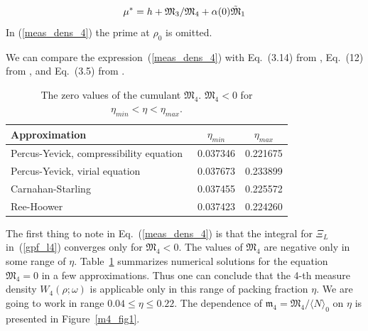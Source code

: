 \begin{equation}
	\label{mu_star}
	\mu^* = h + {\frak M_3}/{\frak M_4} + \alpha(0)\tilde{\frak M}_1
\end{equation}
In (\ref{meas_dens_4}) the prime at $\rho_0$ is omitted.

We can compare the expression~(\ref{meas_dens_4}) with Eq.~(3.14) from \cite{Yukh1990}, Eq.~(12) from \cite{YukhJSP1995}, and Eq.~(3.5) from \cite{Yukh2013}.

\begin{table}[h]
	\caption{The zero values of the cumulant $\mathfrak{M_4}$. $\mathfrak{M_4} < 0$ for $\eta_{min} < \eta < \eta_{max}$.}
	\label{tab:cum_m4_zeros}
	\begin{center}
		\begin{tabular}{|l|c|c|}
			\hline
			Approximation & $\eta_{min}$ & $\eta_{max}$ \\
			\hline
			Percus-Yevick, compressibility equation~\cite{WertheimPRL1963} \quad & 0.037346 \quad & 0.221675 \quad \\
			Percus-Yevick, virial equation~\cite{ThieleJCP1963}	& 0.037673 & 0.233899 \\
			Carnahan-Starling~\cite{CarnahanStarling1969}		& 0.037455 & 0.225572 \\
			Ree-Hoower~\cite{ReeHooverJCP1964}					& 0.037423 & 0.224260 \\
			\hline
		\end{tabular}
	\end{center}
\end{table}

The first thing to note in Eq.~(\ref{meas_dens_4}) is that the integral for $\Xi_L$ in~(\ref{gpf_l4}) converges only for $\mathfrak{M}_4 < 0$. The values of $\mathfrak M_4$ are negative only in some range of $\eta$. Table~{\ref{tab:cum_m4_zeros}} summarizes numerical solutions for the equation $\mathfrak{M_4}=0$ in a few approximations. Thus one can conclude that the 4-th measure density $W_4(\rho; \omega)$ is applicable only in this range of packing fraction $\eta$. We are going to work in range $0.04 \le \eta \le 0.22$. The dependence of $\mathfrak{m}_4 = \mathfrak{M}_4/\langle N \rangle_0$ on $\eta$ is presented in Figure~\ref{m4_fig1}.

